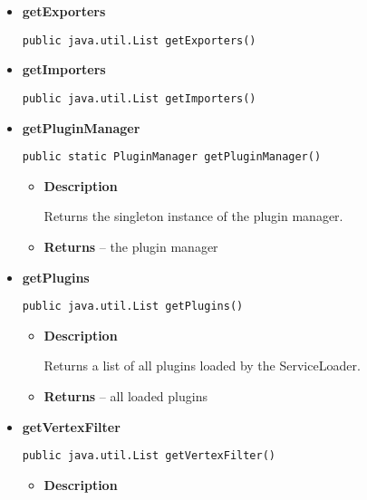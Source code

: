 {{{{{{{{{{{{{{{\begin{itemize}
{\begin{itemize}
{Returns a list of all edge filter provided by plugins.
}
\item{{\bf  Returns} -- 
a list of all edge filter 
}%
\end{itemize}
}%
\item{ 
{\bf  getExporters}\\
\begin{lstlisting}[frame=none]
public java.util.List getExporters()\end{lstlisting} %
}%
\item{ 
{\bf  getImporters}\\
\begin{lstlisting}[frame=none]
public java.util.List getImporters()\end{lstlisting} %
}%
\item{ 
{\bf  getPluginManager}\\
\begin{lstlisting}[frame=none]
public static PluginManager getPluginManager()\end{lstlisting} %
\begin{itemize}
\item{
{\bf  Description}

Returns the singleton instance of the plugin manager.
}
\item{{\bf  Returns} -- 
the plugin manager 
}%
\end{itemize}
}%
\item{ 
{\bf  getPlugins}\\
\begin{lstlisting}[frame=none]
public java.util.List getPlugins()\end{lstlisting} %
\begin{itemize}
\item{
{\bf  Description}

Returns a list of all plugins loaded by the ServiceLoader.
}
\item{{\bf  Returns} -- 
all loaded plugins 
}%
\end{itemize}
}%
\item{ 
{\bf  getVertexFilter}\\
\begin{lstlisting}[frame=none]
public java.util.List getVertexFilter()\end{lstlisting} %
\begin{itemize}
\item{
{\bf  Description}

}
\end{itemize}}
\end{itemize}}}}}}}}}}}}}}}}
